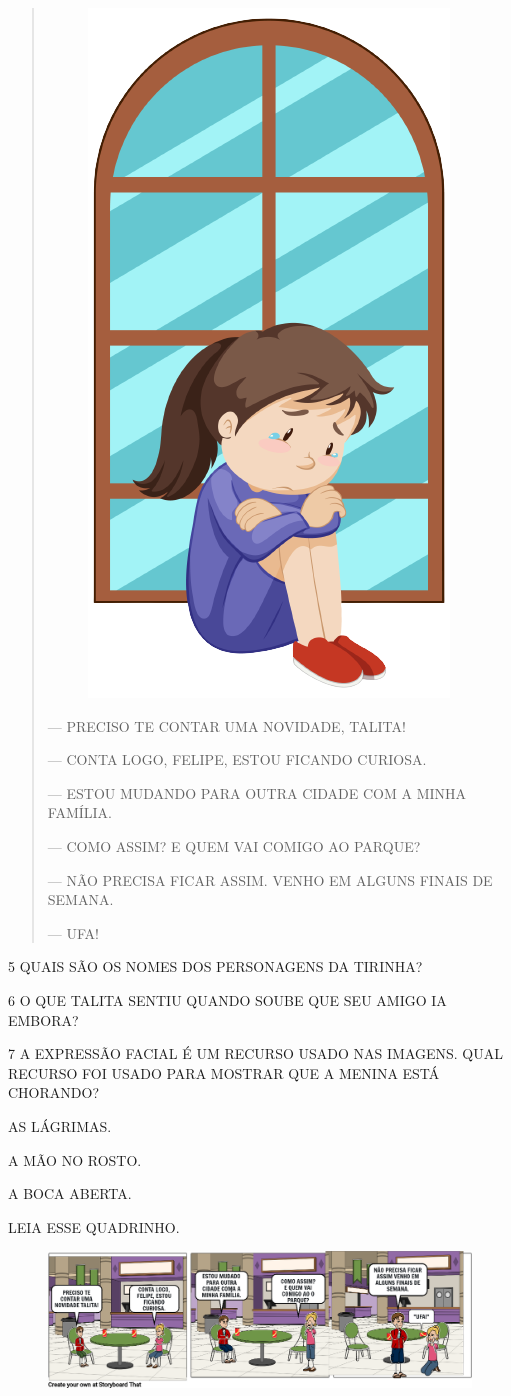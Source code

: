\begin{quote}
\begin{figure}
\includegraphics[width=.3\textwidth]{media/image173a.png}
\end{figure}

— PRECISO TE CONTAR UMA NOVIDADE, TALITA!

— CONTA LOGO, FELIPE, ESTOU FICANDO CURIOSA.

— ESTOU MUDANDO PARA OUTRA CIDADE COM A MINHA FAMÍLIA.

— COMO ASSIM? E QUEM VAI COMIGO AO PARQUE?

— NÃO PRECISA FICAR ASSIM. VENHO EM ALGUNS FINAIS DE SEMANA.

— UFA!
\end{quote}


\num{5} QUAIS SÃO OS NOMES DOS PERSONAGENS DA TIRINHA?


\num{6} O QUE TALITA SENTIU QUANDO SOUBE QUE SEU AMIGO IA EMBORA?


\num{7} A EXPRESSÃO FACIAL É UM RECURSO USADO NAS IMAGENS. QUAL RECURSO FOI USADO PARA MOSTRAR QUE A MENINA ESTÁ CHORANDO?

\begin{boxlist}
 AS LÁGRIMAS.

 A MÃO NO ROSTO.

 A BOCA ABERTA.
\end{boxlist}

\pagebreak
LEIA ESSE QUADRINHO.

\begin{figure}[htpb!]
\includegraphics[width=\textwidth]{media/image175.png}
\end{figure}

